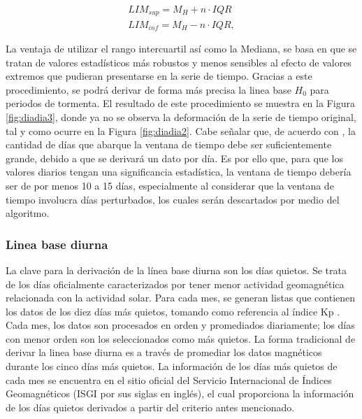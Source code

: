 \begin{equation}
\label{eq:iqr}
    \begin{split}
        LIM_{sup} = M_{H} + n \cdot IQR \\
        LIM_{inf} = M_{H} - n \cdot IQR,
    \end{split}    
\end{equation}

La ventaja de utilizar el rango intercuartil así como la Mediana, se basa en que se tratan de valores estadísticos más robustos y menos sensibles al efecto de valores extremos que pudieran presentarse en la serie de tiempo. Gracias a este procedimiento, se podrá derivar de forma más precisa la linea base $H_0$ para periodos de tormenta. El resultado de este procedimiento se muestra en la Figura \ref{fig:diadia3}, donde ya no se observa la deformación de la serie de tiempo original, tal y como ocurre en la Figura \ref{fig:diadia2}. Cabe señalar que, de acuerdo con \cite{baseline_Gjerloev}, la cantidad de días que abarque la ventana de tiempo debe ser suficientemente grande, debido a que se derivará un dato por día. Es por ello que, para que los valores diarios tengan una significancia estadística, la ventana de tiempo debería ser de por menos 10 a 15 días, especialmente al considerar que la ventana de tiempo involucra días perturbados, los cuales serán descartados por medio del algoritmo.
\vspace{1 em}

\subsubsection{Linea base diurna}

La clave para la derivación de la línea base diurna son los días quietos. Se trata de los días oficialmente caracterizados por tener menor actividad geomagnética relacionada con la actividad solar. Para cada mes, se generan listas que contienen los datos de los diez días más quietos, tomando como referencia al índice Kp \parencite{BARTELS_kp}. Cada mes, los datos son procesados en orden y promediados diariamente; los días con menor orden son los seleccionados como más quietos. La forma tradicional de derivar la linea base diurna es a través de promediar los datos magnéticos durante los cinco días más quietos. La información de los días más quietos de cada mes se encuentra en el sitio oficial del Servicio Internacional de Índices Geomagnéticos (ISGI por sus siglas en inglés), el cual proporciona la información de los días quietos derivados a partir del criterio antes mencionado.
\vspace{1 em}

